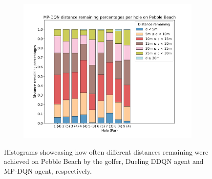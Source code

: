 \documentclass{kththesis}
\begin{document}
\begin{figure}
\begin{subfigure}{\textwidth}
    \centering
    \includegraphics[height=0.3\textheight]{AgentPercentages/MPDQN_Distance_Percentages_Pebble.png} 
    \end{subfigure}
    \caption{Histograms showcasing how often different distances remaining were achieved on Pebble Beach by the golfer, Dueling DDQN agent and MP-DQN agent, respectively.}
    \label{fig:pebble_distance_histograms}
\end{figure}
\end{document}

